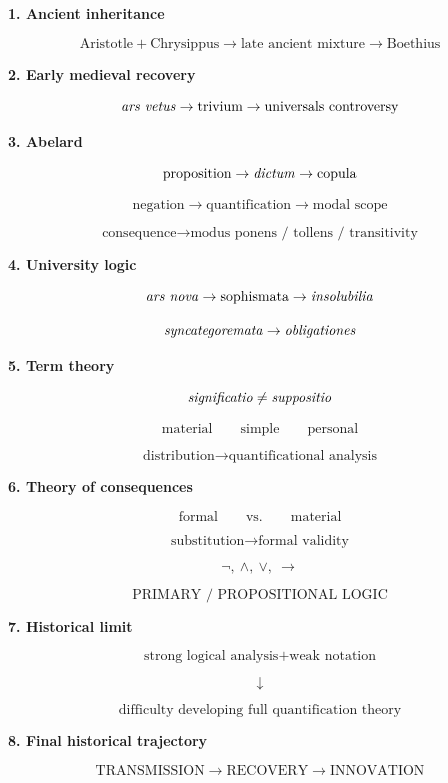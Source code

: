 \documentclass[11pt]{article}
\newcommand{\latin}[1]{\textit{#1}}
\begin{document}
\begin{whiteboard}

\textbf{1. Ancient inheritance}

\[
\text{Aristotle}
+
\text{Chrysippus}
\rightarrow
\text{late ancient mixture}
\rightarrow
\text{Boethius}
\]

\textbf{2. Early medieval recovery}

\[
\text{\latin{ars vetus}}
\rightarrow
\text{trivium}
\rightarrow
\text{universals controversy}
\]

\textbf{3. Abelard}

\[
\text{proposition}
\rightarrow
\text{\latin{dictum}}
\rightarrow
\text{copula}
\]

\[
\text{negation}
\rightarrow
\text{quantification}
\rightarrow
\text{modal scope}
\]

\[
\text{consequence}
\rightarrow
\text{modus ponens / tollens / transitivity}
\]

\textbf{4. University logic}

\[
\text{\latin{ars nova}}
\rightarrow
\text{sophismata}
\rightarrow
\text{\latin{insolubilia}}
\]

\[
\text{\latin{syncategoremata}}
\rightarrow
\text{\latin{obligationes}}
\]

\textbf{5. Term theory}

\[
\text{\latin{significatio}}
\neq
\text{\latin{suppositio}}
\]

\[
\text{material}
\qquad
\text{simple}
\qquad
\text{personal}
\]

\[
\text{distribution}
\rightarrow
\text{quantificational analysis}
\]

\textbf{6. Theory of consequences}

\[
\text{formal}
\qquad
\text{vs.}
\qquad
\text{material}
\]

\[
\text{substitution}
\rightarrow
\text{formal validity}
\]

\[
\neg,\ \land,\ \lor,\ \rightarrow
\]

\[
\boxed{\text{PRIMARY / PROPOSITIONAL LOGIC}}
\]

\textbf{7. Historical limit}

\[
\text{strong logical analysis}
+
\text{weak notation}
\]

\[
\downarrow
\]

\[
\text{difficulty developing full quantification theory}
\]

\textbf{8. Final historical trajectory}

\[
\boxed{
\text{TRANSMISSION}
\rightarrow
\text{RECOVERY}
\rightarrow
\text{INNOVATION}
}
\]

\end{whiteboard}
\end{document}
